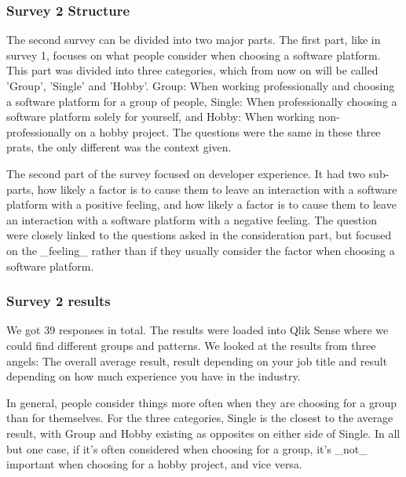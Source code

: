 \documentclass[11pt]{article}
\begin{document}
\begin{multicols}{2}
    \subsubsection{Survey 2 Structure}

    The second survey can be divided into two major parts. The first part,
    like in survey 1, focuses on what people consider when choosing a
    software platform. This part was divided into three categories, which
    from now on will be called 'Group', 'Single' and 'Hobby'. Group: When
    working professionally and choosing a software platform for a group of
    people, Single: When professionally choosing a software platform solely
    for yourself, and Hobby: When working non-professionally on a hobby
    project. The questions were the same in these three prats, the only
    different was the context given.

    The second part of the survey focused on developer experience. It had
    two sub-parts, how likely a factor is to cause them to leave an
    interaction with a software platform with a positive feeling, and how
    likely a factor is to cause them to leave an interaction with a software
    platform with a negative feeling. The question were closely linked to
    the questions asked in the consideration part, but focused on the
    _feeling_ rather than if they usually consider the factor when choosing
    a software platform.

    \subsubsection{Survey 2 results}

    We got 39 responses in total. The results were loaded into Qlik Sense
    where we could find different groups and patterns. We looked at the
    results from three angels: The overall average result, result depending
    on your job title and result depending on how much experience you have
    in the industry.


    In general, people consider things more often when they are choosing for
    a group than for themselves. For the three categories, Single is the
    closest to the average result, with Group and Hobby existing as
    opposites on either side of Single. In all but one case, if it's often
    considered when choosing for a group, it's _not_ important when choosing
    for a hobby project, and vice versa.


\end{multicols}
\end{document}
